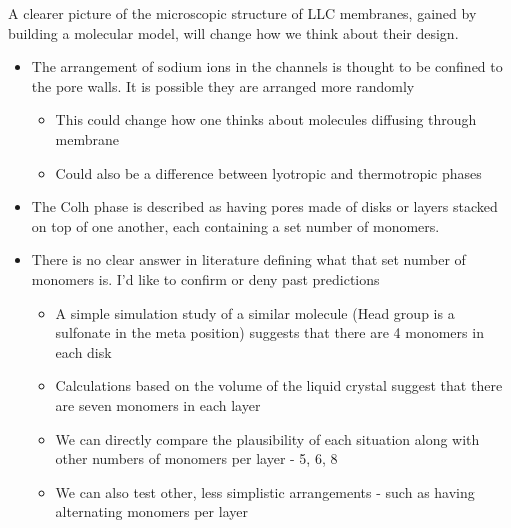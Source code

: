 \documentclass{article}
\begin{document}
	A clearer picture of the microscopic structure of LLC membranes, gained by building a molecular model, will change how we think about their design. 
	\begin{itemize}
		\item The arrangement of sodium ions in the channels is thought to be confined to the pore walls. It is possible they are arranged more randomly
		\begin{itemize}
			\item This could change how one thinks about molecules diffusing through membrane
			\item Could also be a difference between lyotropic and thermotropic phases
		\end{itemize}
		\item The Colh phase is described as having pores made of disks or layers stacked on top of one another, each containing a set number of monomers. 
		\item There is no clear answer in literature defining what that set number of monomers is. I'd like to confirm or deny past predictions
		\begin{itemize}
			\item A simple simulation study of a similar molecule (Head group is a sulfonate in the meta position) suggests that there are 4 monomers in each disk
			\item Calculations based on the volume of the liquid crystal suggest that there are seven monomers in each layer
			\item We can directly compare the plausibility of each situation along with other numbers of monomers per layer - 5, 6, 8
			\item We can also test other, less simplistic arrangements - such as having alternating monomers per layer  %
		\end{itemize}
	\end{itemize}
	
\end{document}
